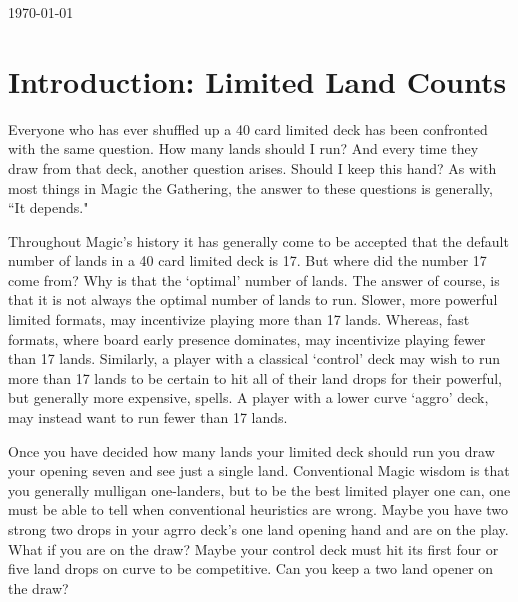 \documentclass[oneside]{book}   %
\begin{document}
\begin{titlepage}
	\vfill\vfill\vfill %
	
	{\large\today} %
	
	
	 
	
	\vfill %
	
\end{titlepage}

\tableofcontents
 
\mainmatter
 
\chapter{Introduction: Limited Land Counts}
\label{intro}

Everyone who has ever shuffled up a 40 card limited deck has been confronted with the same question. How many lands should I run? And every time they draw from that deck, another question arises. Should I keep this hand? As with most things in Magic the Gathering, the answer to these questions is generally, ``It depends."

Throughout Magic's history it has generally come to be accepted that the default number of lands in a 40 card limited deck is 17. But where did the number 17 come from? Why is that the `optimal' number of lands. The answer of course, is that it is not always the optimal number of lands to run. Slower, more powerful limited formats, may incentivize playing more than 17 lands. Whereas, fast formats, where board early presence dominates, may incentivize playing fewer than 17 lands. Similarly, a player with a classical `control' deck may wish to run more than 17 lands to be certain to hit all of their land drops for their powerful, but generally more expensive, spells. A player with a lower curve `aggro' deck, may instead want to run fewer than 17 lands. 

Once you have decided how many lands your limited deck should run you draw your opening seven and see just a single land. Conventional Magic wisdom is that you generally mulligan one-landers, but to be the best limited player one can, one must be able to tell when conventional heuristics are wrong. Maybe you have two strong two drops in your agrro deck's one land opening hand and are on the play. What if you are on the draw? Maybe your control deck must hit its first four or five land drops on curve to be competitive. Can you keep a two land opener on the draw? 
\end{document}
